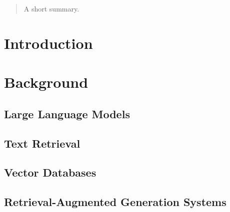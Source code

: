 \documentclass[english,master]{swsLeipzig}
\begin{document}
\begin{frontmatter}
  \begin{abstract}
    A short summary.
  \end{abstract}

  \tableofcontents





\end{frontmatter}

\chapter{Introduction}\label{introduction}


\chapter{Background}\label{background}


\section{Large Language Models}\label{llm}


\section{Text Retrieval}\label{retrieval}


\section{Vector Databases}\label{vdbs}


\section{Retrieval-Augmented Generation Systems}\label{rag}

\end{document}
